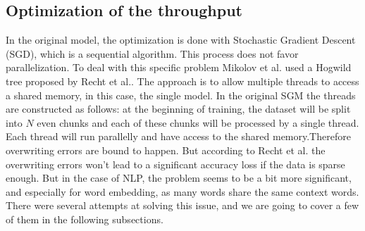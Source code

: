 \subsection{Optimization of the throughput}

In the original model, the optimization is done with Stochastic Gradient Descent (SGD), which is a sequential algorithm. This process does not favor  parallelization. To deal with this specific problem Mikolov et al.\cite{mikolov2} used a Hogwild tree proposed by Recht et al.\cite{hogwild}. The approach is to allow multiple threads to access a shared memory, in this case, the single model. In the original SGM the threads are constructed as follows: at the beginning of training, the dataset will be split into $N$ even chunks and  each of these chunks will be processed by a single thread. Each thread will run parallelly and have access to the shared memory.Therefore overwriting errors are bound to happen. But according to Recht et al.\cite{hogwild} the overwriting errors won't lead to a significant accuracy loss if the data is sparse enough. But in the case of NLP, the problem seems to be a bit more significant, and especially for word embedding, as many words share the same context words. There were several attempts at solving this issue, and we are going to cover a few of them in the following subsections. 

